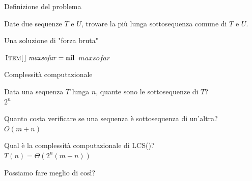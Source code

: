 \begin{frame}{Definizione del problema}

\vspace{-9pt}
\begin{myboxtitle}
Date due sequenze $T$ e $U$, trovare la più lunga sottosequenza comune di $T$ e $U$.
\end{myboxtitle}

\begin{myboxtitle}[Esempio]
\end{myboxtitle}


\end{frame}

\begin{frame}[shrink=5]{Una soluzione di "forza bruta"}
  
\vspace{-9pt}
\begin{Procedure}
\caption[A]{\INTEGER\ ($\Item[\,]\ T$, $\Item[\,]\ U$)}

  $\textsc{Item}[\,]\ \mathit{maxsofar} = \textbf{nil}$\;
  \Return $\mathit{maxsofar}$\;
\end{Procedure}
  
\end{frame}


\begin{frame}{Complessità computazionale}

\vspace{-9pt}
\BIL
\item Data una sequenza $T$ lunga $n$, quante sono le sottosequenze di
$T$?\\ \pause \alert{$2^n$}
\item Quanto costa verificare se una sequenza è sottosequenza di un'altra?\\
\pause \alert{$O(m+n)$}
\item Qual è la complessità computazionale di \textsf{LCS()}?\\
\pause \alert{$T(n) = \Theta(2^n(m+n))$}
\item Possiamo fare meglio di così?
\EIL

\end{frame}

